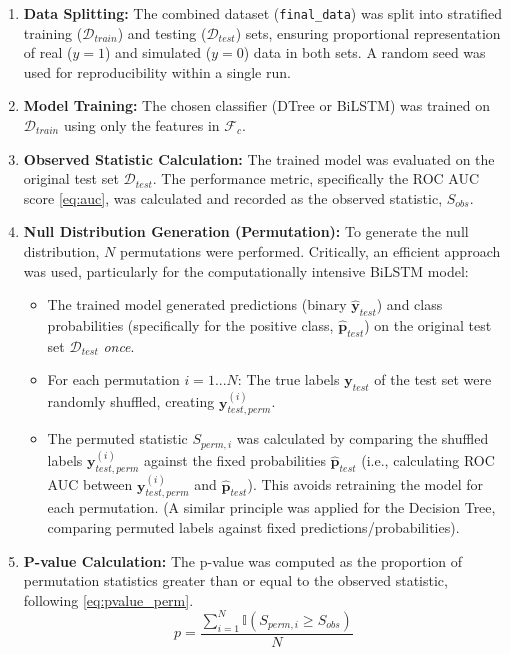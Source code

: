 \begin{enumerate}
  \item \textbf{Data Splitting:} The combined dataset (\texttt{final\_data}) was split into stratified training ($\mathcal{D}_{train}$) and testing ($\mathcal{D}_{test}$) sets, ensuring proportional representation of real ($y=1$) and simulated ($y=0$) data in both sets. A random seed was used for reproducibility within a single run.
  \item \textbf{Model Training:} The chosen classifier (DTree or BiLSTM) was trained on $\mathcal{D}_{train}$ using only the features in $\mathcal{F}_c$.
  \item \textbf{Observed Statistic Calculation:} The trained model was evaluated on the original test set $\mathcal{D}_{test}$. The performance metric, specifically the ROC AUC score \autoref{eq:auc}, was calculated and recorded as the observed statistic, $S_{obs}$.
  \item \textbf{Null Distribution Generation (Permutation):} To generate the null distribution, $N$ permutations were performed. Critically, an efficient approach was used, particularly for the computationally intensive BiLSTM model:
        \begin{itemize}
          \item The trained model generated predictions (binary $\hat{\mathbf{y}}_{test}$) and class probabilities (specifically for the positive class, $\hat{\mathbf{p}}_{test}$) on the original test set $\mathcal{D}_{test}$ \textit{once}.
          \item For each permutation $i=1...N$: The true labels $\mathbf{y}_{test}$ of the test set were randomly shuffled, creating $\mathbf{y}_{test, perm}^{(i)}$.
          \item The permuted statistic $S_{perm, i}$ was calculated by comparing the shuffled labels $\mathbf{y}_{test, perm}^{(i)}$ against the fixed probabilities $\hat{\mathbf{p}}_{test}$ (i.e., calculating ROC AUC between $\mathbf{y}_{test, perm}^{(i)}$ and $\hat{\mathbf{p}}_{test}$). This avoids retraining the model for each permutation. (A similar principle was applied for the Decision Tree, comparing permuted labels against fixed predictions/probabilities).
        \end{itemize}
  \item \textbf{P-value Calculation:} The p-value was computed as the proportion of permutation statistics greater than or equal to the observed statistic, following \autoref{eq:pvalue_perm}.
        \begin{equation}
          p = \frac{\sum_{i=1}^{N} \mathbb{I}(S_{perm, i} \ge S_{obs})}{N}
          \nonumber
        \end{equation}
\end{enumerate}

